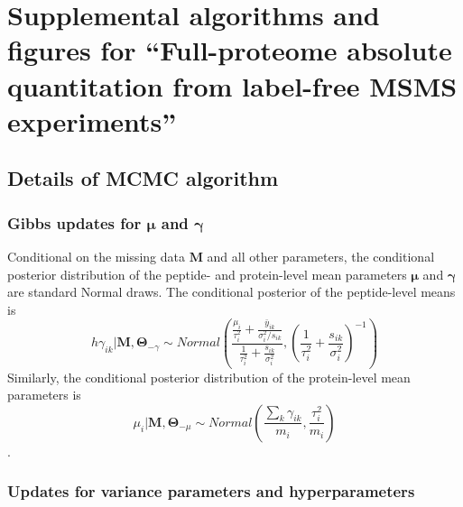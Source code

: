 


\chapter{Supplemental algorithms and figures for ``Full-proteome absolute quantitation from label-free MSMS experiments''}


\section{Details of MCMC algorithm}
\label{supp:proteomics:sec:mcmcDetails}

\subsection{Gibbs updates for $\bm \mu$ and $\bm \gamma$}
\label{supp:proteomics:sc:draw_intensity_parameters}

Conditional on the missing data $\bm M$ and all other parameters, the conditional posterior distribution of the peptide- and protein-level mean parameters $\bm \mu$ and $\bm \gamma$ are standard Normal draws.
The conditional posterior of the peptide-level means is
\begin{equation*}h
\gamma_{ik} | \bm M, \bm \Theta_{-\gamma} \sim Normal\left(\frac{\frac{\mu_{i}}{\tau_{i}^{2}}+\frac{\bar{y}_{ik}}{\sigma_{i}^{2}/s_{ik}}}{\frac{1}{\tau_{i}^{2}}+\frac{s_{ik}}{\sigma_{i}^{2}}},\left(\frac{1}{\tau_{i}^{2}}+\frac{s_{ik}}{\sigma_{i}^{2}}\right)^{-1}\right)
\end{equation*}
Similarly, the conditional posterior distribution of the protein-level mean parameters is
\begin{equation*}
\mu_{i} | \bm M, \bm \Theta_{-\mu} \sim Normal\left(\frac{\sum_{k}\gamma_{ik}}{m_{i}},\frac{\tau_{i}^{2}}{m_{i}}\right)
\end{equation*}
. 

\subsection{Updates for variance parameters and hyperparameters}


